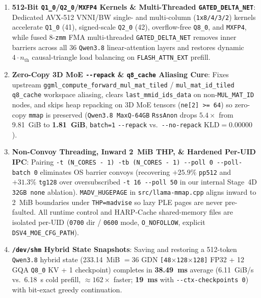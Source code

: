 \documentclass[10pt,twocolumn]{article}
\begin{document}
\begin{enumerate}
    \item \textbf{512-Bit \texttt{Q1\_0}/\texttt{Q2\_0}/\texttt{MXFP4} Kernels \& Multi-Threaded \texttt{GATED\_DELTA\_NET}}: Dedicated AVX-512 VNNI/BW single- and multi-column (\texttt{1x8/4/3/2}) kernels accelerate \texttt{Q1\_0} (41), signed-scale \texttt{Q2\_0} (42), overflow-free \texttt{Q8\_0}, and \texttt{MXFP4}, while fused 8-\texttt{zmm} FMA multi-threaded \texttt{GATED\_DELTA\_NET} removes inner barriers across all 36 \texttt{Qwen3.8} linear-attention layers and restores dynamic $4\cdot n_{\text{th}}$ causal-triangle load balancing on \texttt{FLASH\_ATTN\_EXT} prefill.
    \item \textbf{Zero-Copy 3D MoE \texttt{{-}{-}repack} \& \texttt{q8\_cache} Aliasing Cure}: Fixes upstream \texttt{ggml\_compute\_forward\_mul\_mat\_tiled} / \texttt{mul\_mat\_id\_tiled} \texttt{q8\_cache} workspace aliasing, clears \texttt{last\_mmid\_ids\_data} on non-\texttt{MUL\_MAT\_ID} nodes, and skips heap repacking on 3D MoE tensors (\texttt{ne[2] >= 64}) so zero-copy \texttt{mmap} is preserved (\texttt{Qwen3.8 MaxQ-64GB} \texttt{RssAnon} drops $5.4\times$ from 9.81~GiB to \textbf{1.81~GiB}, \texttt{batch=1} \texttt{{-}{-}repack} vs.\ \texttt{{-}{-}no-repack} $\text{KLD}=0.00000$).
    \item \textbf{Non-Convoy Threading, Inward 2~MiB THP, \& Hardened Per-UID IPC}: Pairing \texttt{-t (N\_CORES - 1) -tb (N\_CORES - 1) {-}{-}poll 0 {-}{-}poll-batch 0} eliminates OS barrier convoys (recovering $+25.9\%$ \texttt{pp512} and $+31.3\%$ \texttt{tg128} over oversubscribed \texttt{-t 16 {-}{-}poll 50} in our internal Stage~4D \texttt{32GB none} ablation). \texttt{MADV\_HUGEPAGE} in \texttt{src/llama-mmap.cpp} aligns inward to 2~MiB boundaries under \texttt{THP=madvise} so lazy PLE pages are never pre-faulted. All runtime control and HARP-Cache shared-memory files are isolated per-UID (\texttt{0700} dir / \texttt{0600} mode, \texttt{O\_NOFOLLOW}, explicit \texttt{DSV4\_MOE\_CFG\_PATH}).
    \item \textbf{\texttt{/dev/shm} Hybrid State Snapshots}: Saving and restoring a 512-token \texttt{Qwen3.8} hybrid state (233.14~MiB $= 36$ GDN \texttt{[48$\times$128$\times$128]} FP32 + 12 GQA \texttt{Q8\_0} KV + 1 checkpoint) completes in \textbf{38.49~ms} average (6.11~GiB/s vs.\ 6.18~s cold prefill, ${\approx}162\times$ faster; \textbf{19~ms} with \texttt{{-}{-}ctx-checkpoints 0}) with bit-exact greedy continuation.
\end{enumerate}
\end{document}
